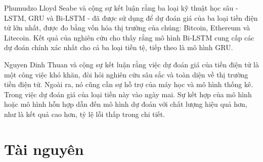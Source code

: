 \documentclass[conference]{IEEEtran}
\begin{document}
	Phumudzo Lloyd Seabe và cộng sự \cite{b7} kết luận rằng ba loại kỹ thuật học sâu - LSTM, GRU và Bi-LSTM - đã được sử dụng để dự đoán giá của ba loại tiền điện tử lớn nhất, được đo bằng vốn hóa thị trường của chúng: Bitcoin, Ethereum và Litecoin. Kết quả của nghiên cứu cho thấy rằng mô hình Bi-LSTM cung cấp các dự đoán chính xác nhất cho cả ba loại tiền tệ, tiếp theo là mô hình GRU.\par
	Nguyen Dinh Thuan và cộng sự \cite{b8} kết luận rằng việc dự đoán giá của tiền điện tử là một công việc khó khăn, đòi hỏi nghiên cứu sâu sắc và toàn diện về thị trường tiền điện tử. Ngoài ra, nó cũng cần sự hỗ trợ của máy học và mô hình thống kê. Trong việc dự đoán giá của loại tiền này vào ngày mai. Sự kết hợp của mô hình hoặc mô hình hỗn hợp dẫn đến mô hình dự đoán với chất lượng hiệu quả hơn, như là kết quả cao hơn, tỷ lệ lỗi thấp trong chi tiết.
	
	\section{Tài nguyên}
\end{document}
